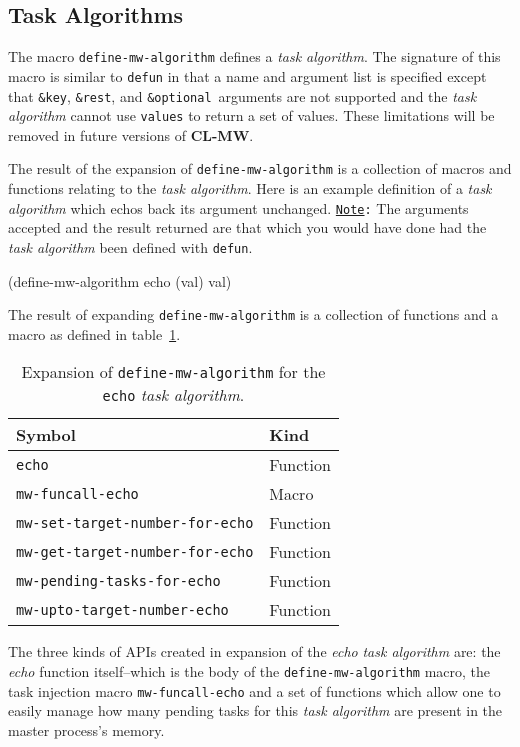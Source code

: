 \documentclass[titlepage,12pt]{book}
\newcommand{\xsmall}{\latexhtml{\small}{}}
\newcommand{\xnormalsize}{\latexhtml{\normalsize}{}}
\newcommand{\clmw}{\xsmall\textbf{CL-MW}\xnormalsize\xspace}
\newcommand{\ta}{\textit{task algorithm}\xspace}
\newcommand{\func}[1]{\xsmall\mbox{\uppercase{\texttt{#1}}}\xnormalsize\xspace}
\newcommand{\macro}[1]{\xsmall\mbox{\uppercase{\texttt{#1}}}\xnormalsize\xspace}
\newcommand{\bold}[1]{\textbf{#1}\xspace}
\newcommand{\key}{\texttt{\&key}\xspace}
\newcommand{\rest}{\texttt{\&rest}\xspace}
\newcommand{\optional}{\texttt{\&optional}\xspace}
\newcommand{\Note}{\texttt{\underline{Note}:}\xspace}
\begin{document}
\subsection{Task Algorithms}

The macro \macro{define-mw-algorithm} defines a \ta. The signature of
this macro is similar to \macro{defun} in that a name and argument
list is specified except that \key, \rest, and \optional\ arguments
are not supported and the \ta cannot use \macro{values} to return
a set of values. These limitations will be removed in future versions
of \clmw.

The result of the expansion of \macro{define-mw-algorithm} is a
collection of macros and functions relating to the \ta. Here is
an example definition of a \ta which echos back its argument
unchanged. \Note The arguments accepted and the result returned
are that which you would have done had the \ta been defined with
\macro{defun}.

\begin{lisp}[caption=The \texttt{echo} Task Algorithm]
(define-mw-algorithm echo (val)
	val)
\end{lisp}

The result of expanding \macro{define-mw-algorithm} is a collection of
functions and a macro as defined in table~\ref{expanded-define-mw-algorithm}.

\begin{table}[hbt]
\begin{center}
\begin{tabular}{||l|l||} \hline
\bold{Symbol}						& \bold{Kind} \\ \hline
\func{echo}							& Function \\ \hline
\macro{mw-funcall-echo}				& Macro \\ \hline
\func{mw-set-target-number-for-echo}	& Function \\ \hline
\func{mw-get-target-number-for-echo}	& Function \\ \hline
\func{mw-pending-tasks-for-echo}	& Function \\ \hline
\func{mw-upto-target-number-echo}		& Function \\ \hline
\end{tabular}
\caption{\label{expanded-define-mw-algorithm}
		Expansion of \macro{define-mw-algorithm} for the \texttt{echo} \ta.}
\end{center}
\end{table}

The three kinds of APIs created in expansion of the \emph{echo}
\ta are: the \emph{echo} function itself--which is the body of
the \macro{define-mw-algorithm} macro, the task injection macro
\macro{mw-funcall-echo} and a set of functions which allow one to
easily manage how many pending tasks for this \ta are present in
the master process's memory.
\end{document}
